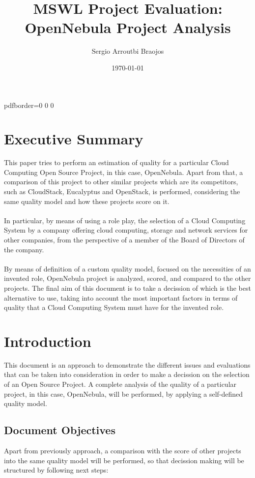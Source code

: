 \documentclass[11pt]{article}
\title{\textbf{MSWL Project Evaluation: OpenNebula Project Analysis}}
\author{Sergio Arroutbi Braojos}
\date{\today}
\begin{document}
\hypersetup
{   
pdfborder={0 0 0}
}
   
\maketitle

\tableofcontents

\pagebreak

\section{Executive Summary}
This paper tries to perform an estimation of quality for a particular Cloud Computing Open Source Project, in this case, OpenNebula. Apart from that, a comparison of this project to other similar projects which are its competitors, such as CloudStack, Eucalyptus and OpenStack, is performed, considering the same quality model and how these projects score on it.\\
\\
In particular, by means of using a role play, the selection of a Cloud Computing System by a company offering cloud computing, storage and network services for other companies, from the perspective of a member of the Board of Directors of the company.\\
\\
By means of definition of a custom quality model, focused on the necessities of an invented role, OpenNebula project is analyzed, scored, and compared to the other projects. The final aim of this document is to take a decission of which is the best alternative to use, taking into account the most important factors in terms of quality that a Cloud Computing System must have for the invented role.

\section{Introduction} \label{sec:introduction}
This document is an approach to demonstrate the different issues and evaluations that can be taken into consideration in order to make a decission on the selection of an Open Source Project. A complete analysis of the quality of a particular project, in this case, OpenNebula, will be performed, by applying a self-defined quality model. 

\subsection{Document Objectives}
Apart from previously approach, a comparison with the score of other projects into the same quality model will be performed, so that decission making will be structured by following next steps:
\end{document}
